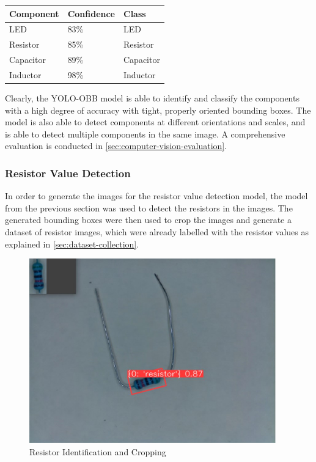 \begin{table}[H]
  \centering
  \begin{tabularx}{0.9\textwidth}{|X|X|X|}
    \hline
    \textbf{Component} & \textbf{Confidence} & \textbf{Class} \\
    \hline
    LED & 83\% & LED \\
    \hline
    Resistor & 85\% & Resistor \\
    \hline
    Capacitor & 89\% & Capacitor \\
    \hline
    Inductor & 98\% & Inductor \\
    \hline
  \end{tabularx}
\end{table}

Clearly, the YOLO-OBB model is able to identify and classify the components with a high degree of accuracy with tight, properly oriented bounding boxes. The model is also able to detect components at different orientations and scales, and is able to detect multiple components in the same image. A comprehensive evaluation is conducted in \autoref{sec:computer-vision-evaluation}.


\subsubsection{Resistor Value Detection}
In order to generate the images for the resistor value detection model, the model from the previous section was used to detect the resistors in the images. The generated bounding boxes were then used to crop the images and generate a dataset of resistor images, which were already labelled with the resistor values as explained in \autoref{sec:dataset-collection}.

\begin{figure}[H]
  \hfill
  \begin{minipage}[t]{\textwidth}
    \centering
    \includegraphics[height=8cm]{imgs/cv/2024-06-10_21-45-23_python.jpg}
    \caption{Resistor Identification and Cropping}
    \label{fig:resistor-cropping}
  \end{minipage}
\end{figure}

